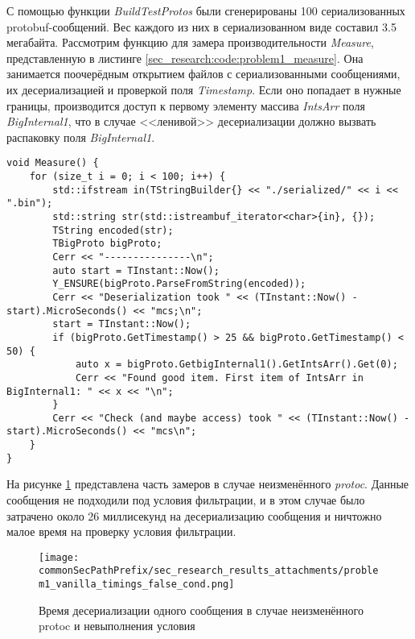 С помощью функции \textit{BuildTestProtos} были сгенерированы 100 сериализованных protobuf-сообщений. Вес каждого из них в сериализованном виде составил 3.5 мегабайта.
Рассмотрим функцию для замера производительности \textit{Measure}, представленную в листинге \ref{sec_research:code:problem1_measure}.
Она занимается поочерёдным открытием файлов с сериализованными сообщениями,
их десериализацией и проверкой поля \textit{Timestamp}. Если оно попадает в нужные границы, производится доступ к первому элементу массива \textit{IntsArr} поля \textit{BigInternal1}, что в случае <<ленивой>> десериализации должно вызвать распаковку поля \textit{BigInternal1}.

\noindent\begin{minipage}{\linewidth}
\begin{lstlisting}[style=CodeListing, caption={Функция Measure}, label=sec_research:code:problem1_measure]
void Measure() {
    for (size_t i = 0; i < 100; i++) {
        std::ifstream in(TStringBuilder{} << "./serialized/" << i << ".bin");
        std::string str(std::istreambuf_iterator<char>{in}, {});
        TString encoded(str);
        TBigProto bigProto;
        Cerr << "---------------\n";
        auto start = TInstant::Now();
        Y_ENSURE(bigProto.ParseFromString(encoded));
        Cerr << "Deserialization took " << (TInstant::Now() - start).MicroSeconds() << "mcs;\n";
        start = TInstant::Now();
        if (bigProto.GetTimestamp() > 25 && bigProto.GetTimestamp() < 50) {
            auto x = bigProto.GetbigInternal1().GetIntsArr().Get(0);
            Cerr << "Found good item. First item of IntsArr in BigInternal1: " << x << "\n";
        }
        Cerr << "Check (and maybe access) took " << (TInstant::Now() - start).MicroSeconds() << "mcs\n";
    }
}
\end{lstlisting}
\end{minipage}

На рисунке \ref{fig:problem1_vanilla_timings_false_cond} представлена часть замеров в случае неизменённого \textit{protoc}. 
Данные сообщения не подходили под условия фильтрации, и в этом случае было затрачено около 26 миллисекунд на десериализацию сообщения и ничтожно малое время на проверку условия фильтрации.

\begin{figure}[H]
    \centering
    \texttt{[image: \\commonSecPathPrefix/sec\_research\_results\_attachments/problem1\_vanilla\_timings\_false\_cond.png]}
    \caption{Время десериализации одного сообщения в случае неизменённого protoc и невыполнения условия}
    \label{fig:problem1_vanilla_timings_false_cond}
\end{figure}

